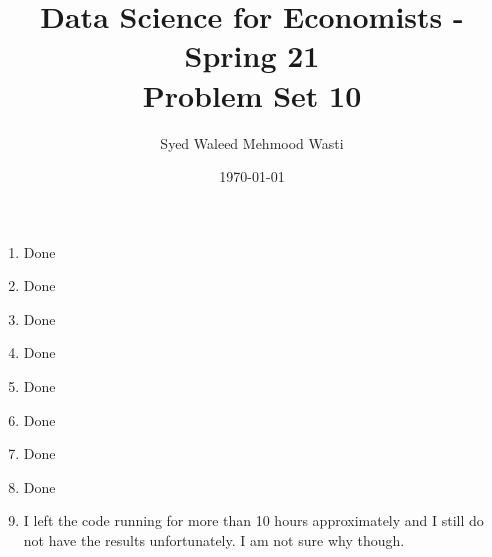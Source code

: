 \documentclass[12pt]{article}
\title{\textbf{Data Science for Economists - Spring 21 \\
\vspace{0.5cm}
Problem Set 10}}
\author{Syed Waleed Mehmood Wasti}
\date{\today}
\begin{document}
\begin{titlepage}
\maketitle
\thispagestyle{empty}
\end{titlepage}


\begin{enumerate}


\item
Done

\item
Done

\item
Done

\item
Done

\item
Done


\item
Done


\item
Done


\item
Done


\item
I left the code running for more than 10 hours approximately and I still do not have the results unfortunately. I am not sure why though. 








\end{enumerate}
\end{document}
